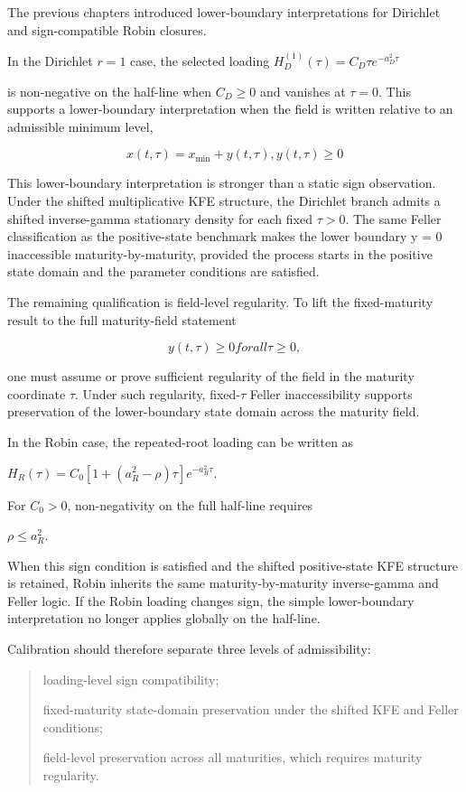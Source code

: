 \documentclass[11pt,oneside]{book}
\begin{document}
The previous chapters introduced lower-boundary interpretations for
Dirichlet and sign-compatible Robin closures.

In the Dirichlet $r=1$ case, the selected loading $H_D^{(1)}(\tau)=C_D\tau e^{-a_D^2\tau}$

is non-negative on the half-line when $C_D\geq0$ and vanishes at $\tau=0$.
This supports a lower-boundary interpretation when the field is written
relative to an admissible minimum level,

\[
x(t,\tau)=x_{\min}+y(t,\tau), y(t,\tau)\ge0
\]

This lower-boundary interpretation is stronger than a static sign
observation. Under the shifted multiplicative KFE structure, the
Dirichlet branch admits a shifted inverse-gamma stationary density for
each fixed $\tau>0$. The same Feller classification as the
positive-state benchmark makes the lower boundary y = 0 inaccessible
maturity-by-maturity, provided the process starts in the positive state
domain and the parameter conditions are satisfied.

The remaining qualification is field-level regularity. To lift the
fixed-maturity result to the full maturity-field statement

\[
y(t,\tau)\ge0 for all \tau\ge0,
\]

one must assume or prove sufficient regularity of the field in the
maturity coordinate $\tau$. Under such regularity, fixed-$\tau$ Feller
inaccessibility supports preservation of the lower-boundary state domain
across the maturity field.

In the Robin case, the repeated-root loading can be written as

$H_R(\tau)=C_0[1+(a_R^2-\rho)\tau]e^{-a_R^2\tau}$.

For $C_0>0$, non-negativity on the full half-line requires

$\rho\leq a_R^2$.

When this sign condition is satisfied and the shifted positive-state KFE
structure is retained, Robin inherits the same maturity-by-maturity
inverse-gamma and Feller logic. If the Robin loading changes sign, the
simple lower-boundary interpretation no longer applies globally on the
half-line.

Calibration should therefore separate three levels of admissibility:

\begin{quote}
\item  loading-level sign compatibility;

\item  fixed-maturity state-domain preservation under the shifted KFE and
Feller conditions;

\item  field-level preservation across all maturities, which requires
maturity regularity.
\end{quote}
\end{document}
